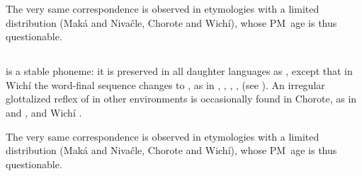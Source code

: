 The very same correspondence is observed in etymologies with a limited distribution (Maká and Nivaĉle, Chorote and Wichí), whose PM~age is thus questionable.

\begin{exe}
    \ex \throwpush
    \ex \coati
    \ex \runv
    \ex \smooth
    \ex \agile
    \ex \drum
    \ex \bilecw
    \ex \silkfloss
    \ex \fox
\end{exe}

\subsection{}\label{proto-n}
 is a stable phoneme: it is preserved in all daughter languages as , except that in Wichí the word-final sequence  changes to , as in , , , ,  (see ). An irregular glottalized reflex of  in other environments is occasionally found in Chorote, as in  and , and Wichí .

\begin{exe}
    \ex \gofirst
    \ex \shout
    \ex \stinger \label{n-stinger}
    \ex \putv
    \ex \killbird
    \ex \crab
    \ex \north
    \ex \suncho
    \ex \water \label{n-water}
    \ex \testicle
    \ex \sendv
    \ex \eatkun
    \ex \stretchout
    \ex \youngerbro
    \ex \thorncutjan
    \ex \killv
    \ex \chaniarf \label{n-chaniarf}
    \ex \chaniart
    \ex \roast
    \ex \nightmonkey
    \ex \lightfire
    \ex \demn
    \ex \bathe
    \ex \nose
    \ex \father
    \ex \wildmanioc
    \ex \rope
    \ex \smelln
    \ex \bonenu
    \ex \smellv
    \ex \dayworld
    \ex \fillv
    \ex \fishwithhook
    \ex \spank
    \ex \whitequebracho \label{n-whitequebracho}
    \ex \kingvulture \label{n-kingvulture}
    \ex \likelove
    \ex \cat
    \ex \thunder
    \ex \hardv
    \ex \duraznillo
    \ex \healthy \label{n-healthy}
    \ex \seev
    \ex \spring
    \ex \night
    \ex \wildbean
    \ex \waspaniti
    \ex \meat
    \ex \teach
    \ex \bro
\end{exe}

The very same correspondence is observed in etymologies with a limited distribution (Maká and Nivaĉle, Chorote and Wichí), whose PM~age is thus questionable.

\begin{exe}
    \ex \spitcw
    \ex \dreamv
    \ex \tobacco
    \ex \kidney
    \ex \obey
    \ex \hookmn
    \ex \majan
    \ex \cook
    \ex \orphancw
    \ex \vertical
    \ex \toad
    \ex \precipice
    \ex \redbrocket \label{n-redbrocket}
    \ex \ashamedmn
    \ex \piranhamn
    \ex \metal
    \ex \balawasp \label{n-balawasp}
    \ex \burnvt
    \ex \saber
    \ex \paralytic
\end{exe}

